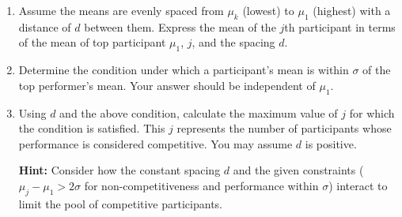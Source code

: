 \documentclass[11pt]{article}
\begin{document}
\begin{enumerate}
    \item Assume the means are evenly spaced from \(\mu_k\) (lowest) to \(\mu_1\) (highest) with a distance of $d$ between them. Express the mean of the $j$th participant in terms of the mean of top participant $\mu_1$, $j$, and the spacing $d$.
    
    \item Determine the condition under which a participant's mean is within \(\sigma\) of the top performer's mean.
    Your answer should be independent of $\mu_1$.
  
    \item Using $d$ and the above condition, calculate the maximum value of \(j\) for which the condition is satisfied. This \(j\) represents the number of participants whose performance is considered competitive. You may assume $d$ is positive.

    \textbf{Hint:} Consider how the constant spacing $d$ and the given constraints (\(\mu_j - \mu_1 > 2\sigma\) for non-competitiveness and performance within \(\sigma\)) interact to limit the pool of competitive participants.
   
\end{enumerate}
\end{document}
